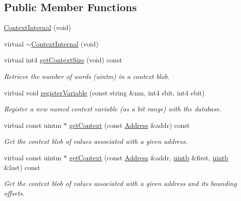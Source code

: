 \subsection*{Public Member Functions}
\begin{DoxyCompactItemize}
\item 
\mbox{\hyperlink{class_context_internal_ade10c48863db0065138ada7171117280}{Context\+Internal}} (void)
\item 
virtual \mbox{\hyperlink{class_context_internal_a1df0ea7175c042853f5f0f6cd337f93a}{$\sim$\+Context\+Internal}} (void)
\item 
virtual int4 \mbox{\hyperlink{class_context_internal_ace67dca0cb2ecdc012cabcfd571a43d8}{get\+Context\+Size}} (void) const
\begin{DoxyCompactList}\small\item\em Retrieve the number of words (uintm) in a context {\itshape blob}. \end{DoxyCompactList}\item 
virtual void \mbox{\hyperlink{class_context_internal_ad4674e15208ed415b717d058edc1a140}{register\+Variable}} (const string \&nm, int4 sbit, int4 ebit)
\begin{DoxyCompactList}\small\item\em Register a new named context variable (as a bit range) with the database. \end{DoxyCompactList}\item 
virtual const uintm $\ast$ \mbox{\hyperlink{class_context_internal_a817dcba491a21368cfa81b522ff21b39}{get\+Context}} (const \mbox{\hyperlink{class_address}{Address}} \&addr) const
\begin{DoxyCompactList}\small\item\em Get the context blob of values associated with a given address. \end{DoxyCompactList}\item 
virtual const uintm $\ast$ \mbox{\hyperlink{class_context_internal_a8b1a3c3cee5fdfe657c114a8ce341e5c}{get\+Context}} (const \mbox{\hyperlink{class_address}{Address}} \&addr, \mbox{\hyperlink{types_8h_a2db313c5d32a12b01d26ac9b3bca178f}{uintb}} \&first, \mbox{\hyperlink{types_8h_a2db313c5d32a12b01d26ac9b3bca178f}{uintb}} \&last) const
\begin{DoxyCompactList}\small\item\em Get the context blob of values associated with a given address and its bounding offsets. \end{DoxyCompactList}\item 

\end{DoxyCompactItemize}
